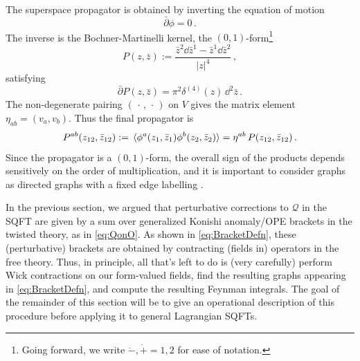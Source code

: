 \documentclass[11pt]{article}
\renewcommand{\bm}{\mathcal}
\begin{document}
The superspace propagator is obtained by inverting the equation of motion
\begin{equation}
    \bar\partial \phi = 0\,.
\end{equation}
The inverse is the Bochner-Martinelli kernel, the $(0,1)$-form\footnote{Going forward, we write $\dot-,\dot+ = 1,2$ for ease of notation.}
\begin{equation}
    P(z,\bar{z}) := \frac{\bar{z}^2 \dd \bar{z}^{1} - \bar{z}^1 \dd\bar{z}^2}{|z|^4}\,,
\end{equation}
satisfying
\begin{equation}
    \bar\partial P(z,\bar{z}) = \pi^2 \delta^{(4)}(z) \,\dd^2 \bar{z}\,.
\end{equation}
The non-degenerate pairing $(\,\cdot\,,\,\cdot\,)$ on $V$ gives the matrix element $\eta_{ab} = (v_a,v_b)$. Thus the final propagator is
\begin{equation}\label{eq:propagatorFields}
    P^{ab}(z_{12},\bar{z}_{12}) := \expval*{\phi^a(z_1,\bar{z}_1) \phi^b(z_2,\bar{z}_2)} = \eta^{ab}\, P(z_{12},\bar{z}_{12})\,.
\end{equation}
Since the propagator is a $(0,1)$-form, the overall sign of the products depends sensitively on the order of multiplication, and it is important to consider graphs as directed graphs with a fixed edge labelling \cite{Budzik:2022mpd, Wang:2024sqm}.

In the previous section, we argued that perturbative corrections to $\bm{Q}$ in the SQFT are given by a sum over generalized Konishi anomaly/OPE brackets in the twisted theory, as in \eqref{eq:QonO}. As shown in \eqref{eq:BracketDefn}, these (perturbative) brackets are obtained by contracting (fields in) operators in the free theory. Thus, in principle, all that's left to do is (very carefully) perform Wick contractions on our form-valued fields, find the resulting graphs appearing in \eqref{eq:BracketDefn}, and compute the resulting Feynman integrals. The goal of the remainder of this section will be to give an operational description of this procedure before applying it to general Lagrangian SQFTs.
\end{document}
